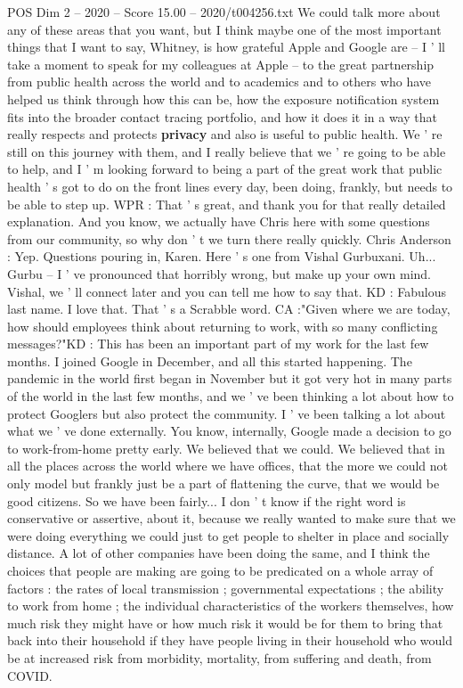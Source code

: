 \begin{textsample}{POS Dim 2 – 2020 – Score 15.00 – 2020/t004256.txt}
We could talk more about any of these areas that you want, but I think maybe one of the most important things that I want to say, Whitney, is how grateful Apple and Google are -- I ' ll take a moment to speak for my colleagues at Apple -- to the great partnership from public health across the world and to academics and to others who have helped us think through how this can be, how the exposure notification system fits into the broader contact tracing portfolio, and how it does it in a way that really respects and protects \textbf{privacy} and also is useful to public health.
We ' re still on this journey with them, and I really believe that we ' re going to be able to help, and I ' m looking forward to being a part of the great work that public health ' s got to do on the front lines every day, been doing, frankly, but needs to be able to step up.
WPR : That ' s great, and thank you for that really detailed explanation.
And you know, we actually have Chris here with some questions from our community, so why don ' t we turn there really quickly.
Chris Anderson : Yep.
Questions pouring in, Karen.
Here ' s one from Vishal Gurbuxani.
Uh...
Gurbu -- I ' ve pronounced that horribly wrong, but make up your own mind.
Vishal, we ' ll connect later and you can tell me how to say that.
KD : Fabulous last name.
I love that.
That ' s a Scrabble word.
CA :"Given where we are today, how should employees think about returning to work, with so many conflicting messages?"KD : This has been an important part of my work for the last few months.
I joined Google in December, and all this started happening.
The pandemic in the world first began in November but it got very hot in many parts of the world in the last few months, and we ' ve been thinking a lot about how to protect Googlers but also protect the community.
I ' ve been talking a lot about what we ' ve done externally.
You know, internally, Google made a decision to go to work-from-home pretty early.
We believed that we could.
We believed that in all the places across the world where we have offices, that the more we could not only model but frankly just be a part of flattening the curve, that we would be good citizens.
So we have been fairly...
I don ' t know if the right word is conservative or assertive, about it, because we really wanted to make sure that we were doing everything we could just to get people to shelter in place and socially distance.
A lot of other companies have been doing the same, and I think the choices that people are making are going to be predicated on a whole array of factors : the rates of local transmission ; governmental expectations ; the ability to work from home ; the individual characteristics of the workers themselves, how much risk they might have or how much risk it would be for them to bring that back into their household if they have people living in their household who would be at increased risk from morbidity, mortality, from suffering and death, from COVID.

\end{textsample}
